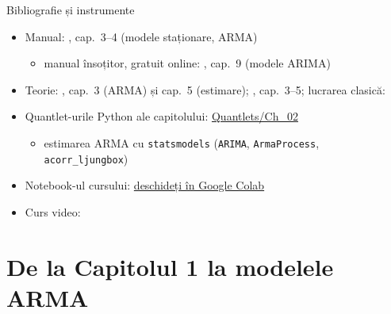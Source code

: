 \begin{frame}{Bibliografie și instrumente}
\itemsize{\small}
\begin{itemize}
    \item Manual: , cap.~3--4 (modele staționare, ARMA)
    \begin{itemize}
        \item manual însoțitor, gratuit online: , cap.~9 (modele ARIMA)
    \end{itemize}
    \item Teorie: , cap.~3 (ARMA) și cap.~5 (estimare); , cap.~3--5; lucrarea clasică: 
    \item Quantlet-urile Python ale capitolului: \href{https://github.com/danpele/Time-Series-Analysis/tree/main/Quantlets/Ch_02}{Quantlets/Ch\_02}
    \begin{itemize}
        \item estimarea ARMA cu \texttt{statsmodels} (\texttt{ARIMA}, \texttt{ArmaProcess}, \texttt{acorr\_ljungbox})
    \end{itemize}
    \item Notebook-ul cursului: \href{\colaburl{notebooks/EN/chapter2_lecture_notebook.ipynb}}{deschideți în Google Colab}
    \item Curs video: 
\end{itemize}
\end{frame}


\section{De la Capitolul 1 la modelele ARMA}

